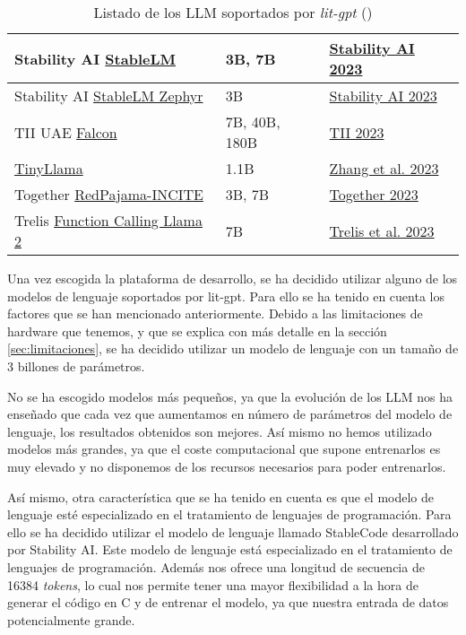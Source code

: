 \begin{table}[H]
{\begin{tabular}{|l|l|l|}
        \hline
        Stability AI \href{tutorials/download_stablelm.md}{StableLM} & 3B, 7B & \href{https://github.com/Stability-AI/StableLM}{Stability AI 2023} \\
        \hline
        Stability AI \href{tutorials/download_stablelm.md}{StableLM Zephyr} & 3B & \href{https://stability.ai/blog/stablecode-llm-generative-ai-coding}{Stability AI 2023} \\
        \hline
        TII UAE \href{tutorials/download_falcon.md}{Falcon} & 7B, 40B, 180B & \href{https://falconllm.tii.ae}{TII 2023} \\
        \hline
        \href{tutorials/download_tinyllama.md}{TinyLlama} & 1.1B & \href{https://github.com/jzhang38/TinyLlama}{Zhang et al. 2023} \\
        \hline
        Together \href{tutorials/download_redpajama_incite.md}{RedPajama-INCITE} & 3B, 7B & \href{https://together.ai/blog/redpajama-models-v1}{Together 2023} \\
        \hline
        Trelis \href{tutorials/download_function_calling_llama_2.md}{Function Calling Llama 2} & 7B & \href{https://huggingface.co/Trelis/Llama-2-7b-chat-hf-function-calling-v2}{Trelis et al. 2023} \\
        \hline
    \end{tabular}%
    }
    \caption[Listado de los LLM soportados por \textit{lit-gpt}]{Listado de los LLM soportados por \textit{lit-gpt} (\cite{litGPT})}
    \label{tab:litGPT}
\end{table}

Una vez escogida la plataforma de desarrollo, se ha decidido utilizar alguno de los
modelos de lenguaje soportados por lit-gpt. Para ello se ha tenido en cuenta los
factores que se han mencionado anteriormente. Debido a las limitaciones de hardware
que tenemos, y que se explica con más detalle en la sección \ref{sec:limitaciones},
se ha decidido utilizar un modelo de lenguaje con un tamaño de 3 billones de parámetros.

No se ha escogido modelos más pequeños, ya que la evolución de los LLM nos ha enseñado
que cada vez que aumentamos en número de parámetros del modelo de lenguaje, los resultados
obtenidos son mejores. Así mismo no hemos utilizado modelos más grandes, ya que el coste
computacional que supone entrenarlos es muy elevado y no disponemos de los recursos
necesarios para poder entrenarlos.

Así mismo, otra característica que se ha tenido en cuenta es que el modelo de lenguaje
esté especializado en el tratamiento de lenguajes de programación. Para ello se ha
decidido utilizar el modelo de lenguaje llamado StableCode\cite{StableCode} desarrollado
por Stability AI. Este modelo de lenguaje está especializado en el tratamiento de lenguajes
de programación. Además nos ofrece una longitud de secuencia de 16384 \textit{tokens}, lo cual
nos permite tener una mayor flexibilidad a la hora de generar el código en C y de entrenar
el modelo, ya que nuestra entrada de datos potencialmente grande.

